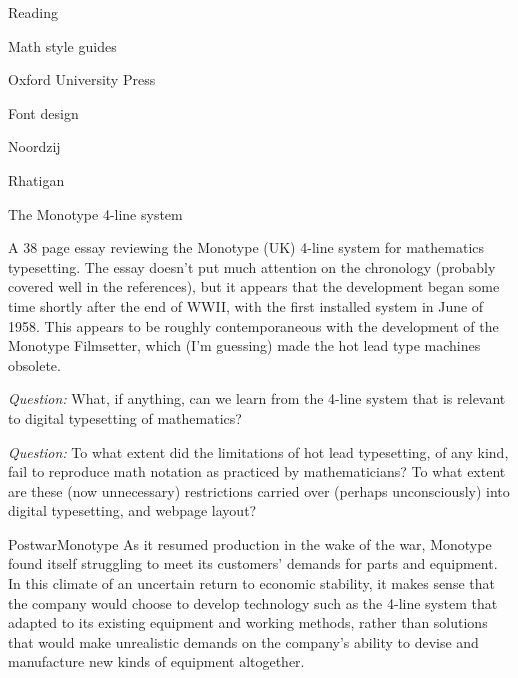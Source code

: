 \documentclass[12pt]{PalisadesLakesBook}
\begin{document}
\begin{plSection}{Reading}
\begin{plSection}{Math style guides}
\begin{plSection}{Oxford University Press}
\end{plSection}%
\end{plSection}%
\begin{plSection}{Font design}
\begin{plSection}{Noordzij}



\end{plSection}%
\begin{plSection}{Rhatigan}
\begin{plSection}{The Monotype 4-line system}


A 38 page essay reviewing the Monotype (UK)
4-line system for mathematics typesetting.
The essay doesn't put much attention on the chronology
(probably covered well in the references),
but it appears that the development
began some time shortly after the end of WWII,
with the first installed system in June of 1958.
This appears to be roughly contemporaneous with
the development of the Monotype Filmsetter,
which (I'm guessing) made the hot lead type machines 
obsolete.~\cite{Eye:2012:MonotypeTimeline}

\emph{Question:} What, if anything, can we learn from the
4-line system that is relevant to digital typesetting
of mathematics?

\emph{Question:} To what extent did the limitations of
hot lead typesetting, of any kind, 
fail to reproduce math notation as practiced by mathematicians?
To what extent are these (now unnecessary) restrictions
carried over (perhaps unconsciously) into digital typesetting,
and webpage layout?

\begin{plQuote}
{}
{PostwarMonotype}
As it resumed production in the wake of the war,
Monotype found itself struggling to meet its customers'
demands for parts and equipment. 
In this climate of an uncertain return to economic stability,
it makes sense that the company would choose to develop
technology such as the 4-line system that adapted to its existing
equipment and working methods, 
rather than solutions that would make unrealistic demands
on the company's ability to devise and manufacture 
new kinds of equipment altogether. 
\end{plQuote}


\end{plSection}
\end{plSection}
\end{plSection}
\end{plSection}
\end{document}
